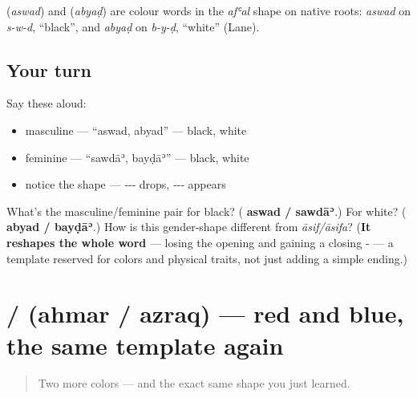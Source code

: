\begin{cousinweb}
\textbf{} (\emph{aswad}) and \textbf{} (\emph{abyaḍ}) are colour words in the \emph{afʿal} shape on native roots: \emph{aswad} on \emph{s-w-d}, \textquotedblleft{}black\textquotedblright{}, and \emph{abyaḍ} on \emph{b-y-ḍ}, \textquotedblleft{}white\textquotedblright{} (Lane).
\end{cousinweb}

\subsection*{Your turn}
Say these aloud:

\begin{itemize}
\raggedright
  \item masculine — \textquotedblleft{}aswad, abyad\textquotedblright{} — black, white
  \item feminine — \textquotedblleft{}sawdāʾ, bayḍāʾ\textquotedblright{} — black, white
  \item notice the shape — ‑‑‑ drops, ‑‑‑ appears
\end{itemize}

\begin{tcolorbox}[breakable,colback=teal!4,colframe=teal!35!black,title={Before you move on}]
What's the masculine/feminine pair for black? (\textbf{ aswad /  sawdāʾ}.) For white? (\textbf{ abyad /  bayḍāʾ}.) How is this gender-shape different from \emph{āsif/āsifa}? (\textbf{It reshapes the whole word} — losing the opening  and gaining a closing ‑ — a template reserved for colors and physical traits, not just adding a simple ending.)
\end{tcolorbox}
\section[\texorpdfstring{\ar{أحمر} \ar{أزرق} (aḥmar azraq)}{أحمر أزرق (aḥmar azraq)}]{ /  (ahmar / azraq) — red and blue, the same template again}

\label{lesson:AR-C09-ahmar-azraq}



\begin{quote}
Two more colors — and the exact same shape you just learned.
\end{quote}

